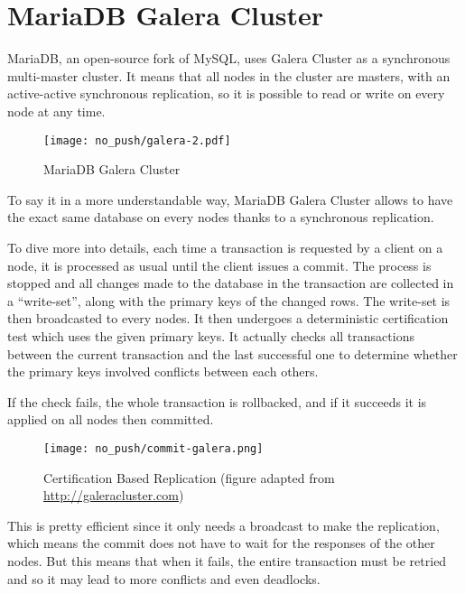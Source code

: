 \section{MariaDB Galera Cluster}

MariaDB, an open-source fork of MySQL, uses Galera Cluster as a synchronous multi-master cluster. It means that all nodes in the cluster are masters, with an active-active synchronous replication, so it is possible to read or write on every node at any time.

\begin{figure}[H]
  \vspace{-10pt}
  \centering
  \centerline{\texttt{[image: no\_push/galera-2.pdf]}}
  \vspace{-5pt}
  \caption{MariaDB Galera Cluster}
  \vspace{-5pt}
  \label{fig:MGC}
\end{figure}

To say it in a more understandable way, MariaDB Galera Cluster allows to have the exact same database on every nodes thanks to a synchronous replication.

To dive more into details, each time a transaction is requested by a client on a node, it is processed as usual until the client issues a commit. The process is stopped and all changes made to the database in the transaction are collected in a ``write-set'', along with the primary keys of the changed rows. The write-set is then broadcasted to every nodes. It then undergoes a deterministic certification test which uses the given primary keys. It actually checks all transactions between the current transaction and the last successful one to determine whether the primary keys involved conflicts between each others.

If the check fails, the whole transaction is rollbacked, and if it succeeds it is applied on all nodes then committed.

\begin{figure}[H]
  \vspace{-10pt}
  \centering
  \centerline{\texttt{[image: no\_push/commit-galera.png]}}
  \vspace{-5pt}
  \caption{Certification Based Replication (figure adapted from \url{http://galeracluster.com}) }
  \vspace{-5pt}
  \label{fig:certificationcommit}
\end{figure}


This is pretty efficient since it only needs a broadcast to make the replication, which means the commit does not have to wait for the responses of the other nodes. But this means that when it fails, the entire transaction must be retried and so it may lead to more conflicts and even deadlocks.

